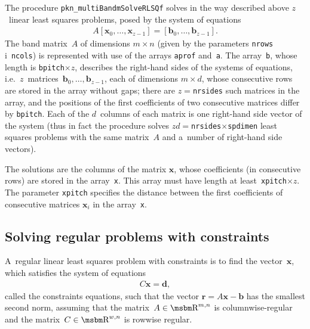 \newpage
{}
\begin{sloppypar}
The procedure \texttt{pkn\_multiBandmSolveRLSQf} solves in the way described
above $z$~linear least squares problems, posed by the system of equations
\begin{align*}
  A[\bm{x}_0,\ldots,\bm{x}_{z-1}] = [\bm{b}_0,\ldots,\bm{b}_{z-1}].
\end{align*}
The band matrix~$A$ of dimensions
$m\times n$ (given by the parameters \texttt{nrows} i~\texttt{ncols}) is
represented with use of the arrays \texttt{aprof} and~\texttt{a}.
The array~\texttt{b}, whose length is \texttt{bpitch}$\times z$,
describes the right-hand sides of the systems of equations,
i.e.\ $z$~matrices~$\bm{b}_0,\ldots,\bm{b}_{z-1}$, each
of dimensions $m\times d$, whose consecutive rows are stored
in the array without gaps; there are $z=$\texttt{nrsides} such matrices
in the array, and the positions of the first coefficients of two consecutive
matrices differ by \texttt{bpitch}. Each of the $d$~columns of each matrix
is one right-hand side vector of the system (thus in fact the procedure solves
$zd={}$\texttt{nrsides}$\times$\texttt{spdimen} least squares problems with the
same matrix~$A$ and a~number of right-hand side vectors).
\end{sloppypar}

The solutions are the columns of the matrix $\bm{x}$, whose coefficients
(in consecutive rows) are stored in the array~\texttt{x}. This array must
have length at least~\texttt{xpitch}$\times z$. The parameter \texttt{xpitch}
specifies the distance between the first coefficients of consecutive
matrices $\bm{x}_i$ in the array~\texttt{x}.


\subsection{Solving regular problems with constraints}

A~regular linear least squares problem with constraints is to find the
vector~$\bm{x}$, which satisfies the system of equations
\begin{align*}
  C\bm{x} = \bm{d},
\end{align*}
called the constraints equations, such that the vector $\bm{r}=A\bm{x}-\bm{b}$
has the smallest second norm, assuming that the matrix~$A\in\R^{m,n}$
is columnwise-regular and the matrix~$C\in\R^{w,n}$ is rowwise regular.

